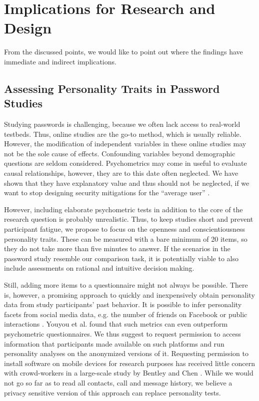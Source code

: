 \section{Implications for Research and Design} \label{sec:implications}
From the discussed points, we would like to point out where the findings have immediate and indirect implications. 

\subsection{Assessing Personality Traits in Password Studies}
Studying passwords is challenging, because we often lack access to real-world testbeds. Thus, online studies are the go-to method, which is usually reliable. However, the modification of independent variables in these online studies may not be the sole cause of effects. Confounding variables beyond demographic questions are seldom considered. Psychometrics may come in useful to evaluate causal relationships, however, they are to this date often neglected. We have shown that they have explanatory value and thus should not be neglected, if we want to stop designing security mitigations for the ``average user'' \cite{Egelman2015AverageUser}. 

However, including elaborate psychometric tests in addition to the core of the research question is probably unrealistic. Thus, to keep studies short and prevent participant fatigue, we propose to focus on the openness and conscientiousness personality traits. These can be measured with a bare minimum of 20 items, so they do not take more than five minutes to answer. If the scenarios in the password study resemble our comparison task, it is potentially viable to also include assessments on rational and intuitive decision making. 

Still, adding more items to a questionnaire might not always be possible. There is, however, a promising approach to quickly and inexpensively obtain personality data from study participants' past behavior. It is possible to infer personality facets from social media data, e.g. the number of friends on Facebook or public interactions \cite{Youyou2015Personality}. Youyou et al. found that such metrics can even outperform psychometric questionnaires. We thus suggest to request permission to access information that participants made available on such platforms and run personality analyses on the anonymized versions of it. Requesting permission to install software on mobile devices for research purposes has received little concern with crowd-workers in a large-scale study by Bentley and Chen \cite{Bentley2015Phonebook}. While we would not go so far as to read all contacts, call and message history, we believe a privacy sensitive version of this approach can replace personality tests.

